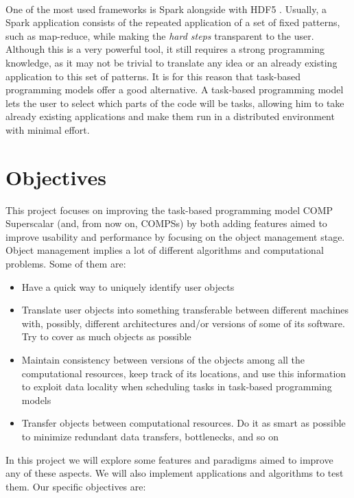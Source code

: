 \\
One of the most used frameworks is Spark \cite{Zaharia:2010:SCC:1863103.1863113} alongside with HDF5 \cite{shvachko2010hadoop}. Usually, a Spark application consists of the repeated application of a set of fixed patterns, such as map-reduce, while making the \textit{hard steps} transparent to the user. Although this is a very powerful tool, it still requires a strong programming knowledge, as it may not be trivial to translate any idea or an already existing application to this set of patterns. It is for this reason that task-based programming models offer a good alternative. A task-based programming model lets the user to select which parts of the code will be tasks, allowing him to take already existing applications and make them run in a distributed environment with minimal effort.

\section{Objectives}
\label{subsec:intro_objectives}
This project focuses on improving the task-based programming model COMP Superscalar (and, from now on, COMPSs) \cite{compss} by both adding features aimed to improve usability and performance by focusing on the object management stage. Object management implies a lot of different algorithms and computational problems. Some of them are:
\begin{itemize}
\item Have a quick way to uniquely identify user objects
\item Translate user objects into something transferable between different machines with, possibly, different architectures and/or versions of some of its software. Try to cover as much objects as possible
\item Maintain consistency between versions of the objects among all the computational resources, keep track of its locations, and use this information to exploit data locality when scheduling tasks in task-based programming models
\item Transfer objects between computational resources. Do it as smart as possible to minimize redundant data transfers, bottlenecks, and so on
\end{itemize}
In this project we will explore some features and paradigms aimed to improve any of these aspects. We will also implement applications and algorithms to test them. Our specific objectives are:


